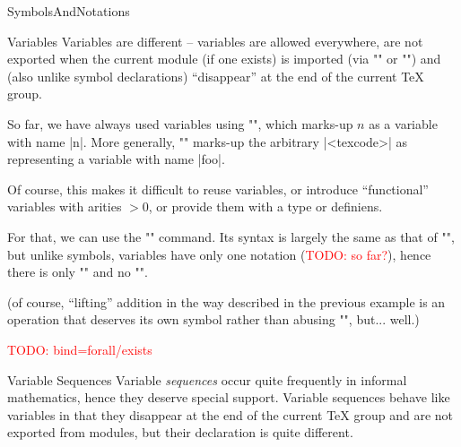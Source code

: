 \begin{smodule}[ns=https://github.com/slatex/sTeX/doc]{SymbolsAndNotations}
\begin{sfragment}{Variables}
  Variables are different -- variables are allowed everywhere, are not exported when the
  current module (if one exists) is imported (via \stexcode"\importmodule" or
  \stexcode"\usemodule") and (also unlike symbol declarations) ``disappear'' at the end of
  the current \TeX\xspace group.

  \begin{function}{\svar}
    So far, we have always used variables using \stexcode"", which marks-up $n$ as
    a variable with name |n|. More generally, \stexcode"" marks-up
    the arbitrary |<texcode>| as representing a variable with name |foo|.
  \end{function}

  Of course, this makes it difficult to reuse variables, or introduce ``functional''
  variables with arities $>0$, or provide them with a type or definiens.

  \begin{function}{\vardef}
    For that, we can use the \stexcode"\vardef" command. Its syntax is largely the same as
    that of \stexcode"\symdef", but unlike symbols, variables have only one notation
    (\textcolor{red}{TODO: so far?}), hence there is only \stexcode"\vardef" and no
    \stexcode"\vardecl".
  \end{function}


(of course, ``lifting'' addition in the way described in the previous example is an
operation that deserves its own symbol rather than abusing \stexcode"\addition",
but... well.)

\textcolor{red}{TODO: bind=forall/exists}
\end{sfragment}

\begin{sfragment}{Variable Sequences}
  Variable \emph{sequences} occur quite frequently in informal mathematics, hence they
  deserve special support. Variable sequences behave like variables in that they disappear
  at the end of the current \TeX\xspace group and are not exported from modules, but their
  declaration is quite different.


\end{sfragment}
\end{smodule}
